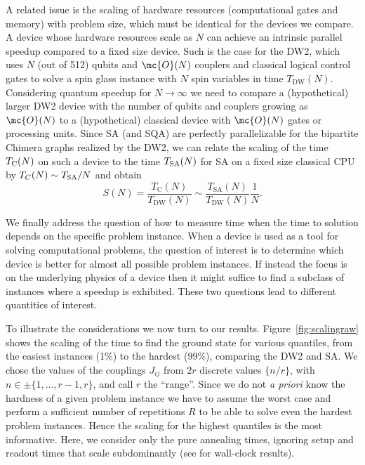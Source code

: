 A related issue is the scaling of hardware resources (computational gates and memory) with problem size, which must be identical for the devices we compare. A  device whose hardware resources scale as $N$ can achieve an intrinsic parallel speedup compared to a fixed size device. Such is the case for the DW2, which uses $N$ (out of 512) qubits and $\mc{O}(N)$ couplers and classical logical control gates to solve a spin glass instance with $N$ spin variables in time $T_{\textrm{DW}}(N)$. Considering quantum speedup for $N\rightarrow\infty$ we need to compare a (hypothetical) larger DW2 device with the number of qubits and couplers growing as $\mc{O}(N)$  to a (hypothetical) classical device with $\mc{O}(N)$ gates or processing units. Since SA (and SQA) are perfectly parallelizable for the bipartite Chimera graphs realized by the DW2, we can relate the scaling of the  time $T_{\rm C}(N)$ on such a device to the time $T_{\rm SA}(N)$ for SA on a fixed size classical CPU by $T_C(N)\sim T_{\rm SA}/N$ and obtain
\begin{equation}
S(N) 
= \frac{T_{\textrm{C}}(N)}{T_{\textrm{DW}}(N)} 
\sim  \frac{T_{\textrm{SA}}(N)}{T_{\textrm{DW}}(N)} \frac{1}{N}.
\label{eq:parallelspeedup1}
\end{equation}
%


We finally address the question of how to measure time when the time to solution depends on the specific problem instance. When a device is used as a tool for solving computational problems, the question of interest is to determine which device is better for almost all possible problem instances. If instead the focus is on the underlying physics of a device then it might suffice to find a subclass of instances where a speedup is exhibited. These two questions lead to different quantities of interest. 


To illustrate the considerations we now turn to our results. Figure~\ref{fig:scalingraw} shows the scaling of the time to find the ground state for various quantiles, from the easiest instances (1\%) to the hardest (99\%), comparing the DW2 and SA. We chose the values of the couplings $J_{ij}$ from $2r$ discrete values  $\{n/r\}$, with $n \in \pm\{1, \dots, r-1, r\}$, and call $r$ the ``range''. Since we do not \textit{a priori} know the hardness of a given problem instance we have to assume the worst case and perform a sufficient number of repetitions $R$ to be able to solve even the hardest problem instances. Hence the scaling for the highest quantiles is the most informative. Here, we consider only the pure annealing times, ignoring setup and readout times that scale subdominantly (see \cite{SM} for wall-clock results). 

